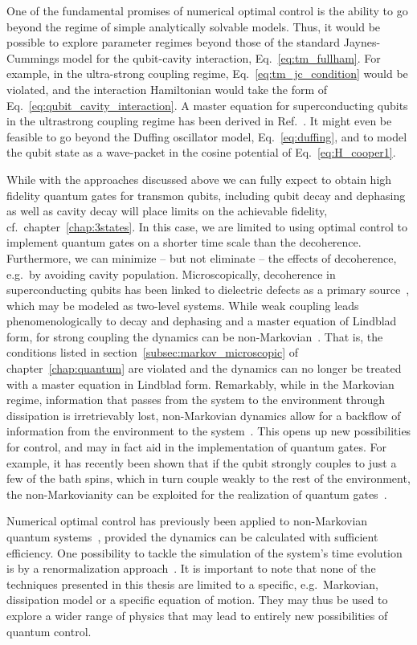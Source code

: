 One of the fundamental promises of numerical optimal control is the ability to
go beyond the regime of simple analytically solvable models. Thus, it would be
possible to explore parameter regimes beyond those of the standard
Jaynes-Cummings model for the qubit-cavity interaction,
Eq.~\eqref{eq:tm_fullham}. For example, in the ultra-strong coupling regime,
Eq.~\eqref{eq:tm_jc_condition} would be violated, and the interaction
Hamiltonian would take the form of Eq.~\eqref{eq:qubit_cavity_interaction}.
A master equation for superconducting qubits in the ultrastrong coupling regime
has been derived in Ref.~\cite{BeaudoinPRA2011}. It might even be feasible to go
beyond the Duffing oscillator model, Eq.~\eqref{eq:duffing}, and to model the
qubit state as a wave-packet in the cosine potential of
Eq.~\eqref{eq:H_cooper1}.

While with the approaches discussed above we can fully expect to obtain high
fidelity quantum gates for transmon qubits, including qubit decay and dephasing
as well as cavity decay will place limits on the achievable fidelity,
cf.~chapter~\ref{chap:3states}. In this case, we are limited to using optimal
control to implement quantum gates on a shorter time scale than the decoherence.
Furthermore, we can minimize -- but not eliminate -- the effects of decoherence,
e.g.\ by avoiding cavity population. Microscopically, decoherence in
superconducting qubits has been linked to dielectric defects as a primary
source~\cite{MartinisPRL2005,ShaliboPRL2010}, which may be modeled as two-level
systems. While weak coupling leads phenomenologically to decay and dephasing and
a master equation of Lindblad form, for strong coupling the dynamics can be
non-Markovian~\cite{KroviPRA2007,FerraroPRB2008,LorenzoPRA2013}. That is, the
conditions listed in section~\ref{subsec:markov_microscopic} of
chapter~\ref{chap:quantum} are violated and the dynamics can no longer be
treated with a master equation in Lindblad form. Remarkably, while in the
Markovian regime, information that passes from the system to the environment
through dissipation is irretrievably lost, non-Markovian dynamics allow for
a backflow of information from the environment to the
system~\cite{BreuerPRL2009,BreuerJPB2012}. This opens up new possibilities for
control, and may in fact aid in the implementation of quantum gates. For
example, it has recently been shown that if the qubit
strongly couples to just a few of the bath spins, which in turn couple weakly to
the rest of the environment, the non-Markovianity can be exploited for the
realization of quantum gates~\cite{ReichNonMarkov}.

Numerical optimal control has previously been applied to non-Markovian quantum
systems~\cite{RebentrostPRL09,AsplundPRL11,SchmidtPRL11,FloetherNJP12},
provided the dynamics can be calculated with sufficient efficiency.
One possibility to tackle the simulation of the system's time evolution is by
a renormalization approach~\cite{GualdiPRA2013}.
It is important to note that none of the techniques presented in this thesis are
limited to a specific, e.g.\ Markovian, dissipation model or a specific equation
of motion. They may thus be used to explore a wider range of physics that may
lead to entirely new possibilities of quantum control.

